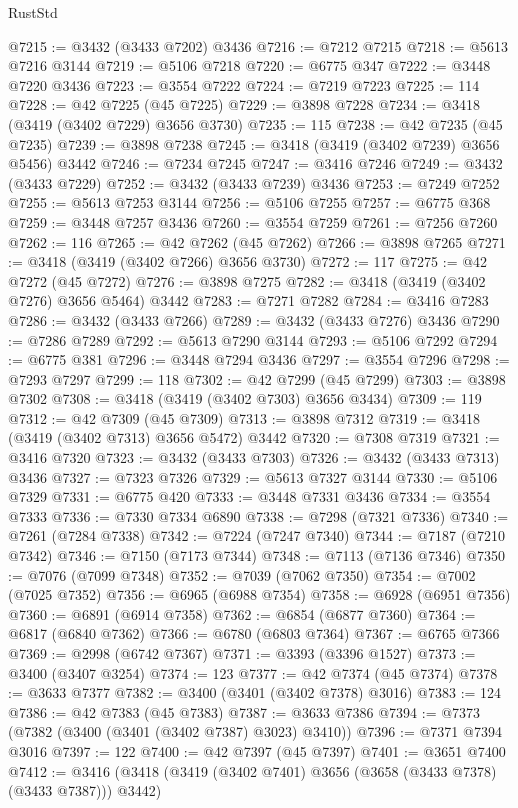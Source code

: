 \begin{lexlean}{RustStd}
\begin{coremodule}
@7215 := @3432 (@3433 @7202) @3436
@7216 := @7212 @7215
@7218 := @5613 @7216 @3144
@7219 := @5106 @7218
@7220 := @6775 @347
@7222 := @3448 @7220 @3436
@7223 := @3554 @7222
@7224 := @7219 @7223
@7225 := 114
@7228 := @42 @7225 (@45 @7225)
@7229 := @3898 @7228
@7234 := @3418 (@3419 (@3402 @7229) @3656 @3730)
@7235 := 115
@7238 := @42 @7235 (@45 @7235)
@7239 := @3898 @7238
@7245 := @3418 (@3419 (@3402 @7239) @3656 @5456) @3442
@7246 := @7234 @7245
@7247 := @3416 @7246
@7249 := @3432 (@3433 @7229)
@7252 := @3432 (@3433 @7239) @3436
@7253 := @7249 @7252
@7255 := @5613 @7253 @3144
@7256 := @5106 @7255
@7257 := @6775 @368
@7259 := @3448 @7257 @3436
@7260 := @3554 @7259
@7261 := @7256 @7260
@7262 := 116
@7265 := @42 @7262 (@45 @7262)
@7266 := @3898 @7265
@7271 := @3418 (@3419 (@3402 @7266) @3656 @3730)
@7272 := 117
@7275 := @42 @7272 (@45 @7272)
@7276 := @3898 @7275
@7282 := @3418 (@3419 (@3402 @7276) @3656 @5464) @3442
@7283 := @7271 @7282
@7284 := @3416 @7283
@7286 := @3432 (@3433 @7266)
@7289 := @3432 (@3433 @7276) @3436
@7290 := @7286 @7289
@7292 := @5613 @7290 @3144
@7293 := @5106 @7292
@7294 := @6775 @381
@7296 := @3448 @7294 @3436
@7297 := @3554 @7296
@7298 := @7293 @7297
@7299 := 118
@7302 := @42 @7299 (@45 @7299)
@7303 := @3898 @7302
@7308 := @3418 (@3419 (@3402 @7303) @3656 @3434)
@7309 := 119
@7312 := @42 @7309 (@45 @7309)
@7313 := @3898 @7312
@7319 := @3418 (@3419 (@3402 @7313) @3656 @5472) @3442
@7320 := @7308 @7319
@7321 := @3416 @7320
@7323 := @3432 (@3433 @7303)
@7326 := @3432 (@3433 @7313) @3436
@7327 := @7323 @7326
@7329 := @5613 @7327 @3144
@7330 := @5106 @7329
@7331 := @6775 @420
@7333 := @3448 @7331 @3436
@7334 := @3554 @7333
@7336 := @7330 @7334 @6890
@7338 := @7298 (@7321 @7336)
@7340 := @7261 (@7284 @7338)
@7342 := @7224 (@7247 @7340)
@7344 := @7187 (@7210 @7342)
@7346 := @7150 (@7173 @7344)
@7348 := @7113 (@7136 @7346)
@7350 := @7076 (@7099 @7348)
@7352 := @7039 (@7062 @7350)
@7354 := @7002 (@7025 @7352)
@7356 := @6965 (@6988 @7354)
@7358 := @6928 (@6951 @7356)
@7360 := @6891 (@6914 @7358)
@7362 := @6854 (@6877 @7360)
@7364 := @6817 (@6840 @7362)
@7366 := @6780 (@6803 @7364)
@7367 := @6765 @7366
@7369 := @2998 (@6742 @7367)
@7371 := @3393 (@3396 @1527)
@7373 := @3400 (@3407 @3254)
@7374 := 123
@7377 := @42 @7374 (@45 @7374)
@7378 := @3633 @7377
@7382 := @3400 (@3401 (@3402 @7378) @3016)
@7383 := 124
@7386 := @42 @7383 (@45 @7383)
@7387 := @3633 @7386
@7394 := @7373 (@7382 (@3400 (@3401 (@3402 @7387) @3023) @3410))
@7396 := @7371 @7394 @3016
@7397 := 122
@7400 := @42 @7397 (@45 @7397)
@7401 := @3651 @7400
@7412 := @3416 (@3418 (@3419 (@3402 @7401) @3656 (@3658 (@3433 @7378) (@3433 @7387))) @3442)

\end{coremodule}
\end{lexlean}
